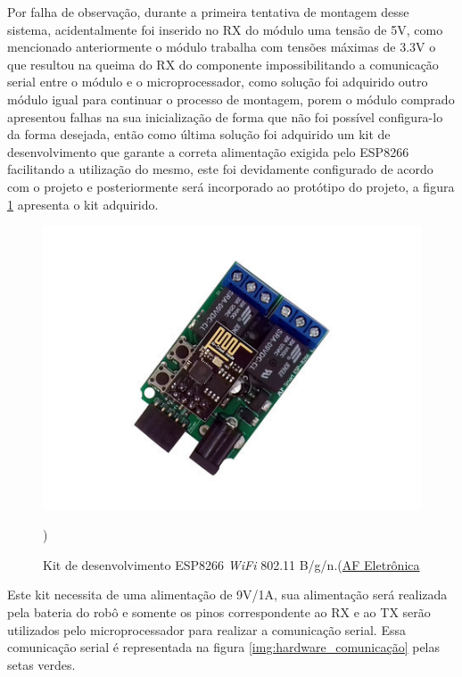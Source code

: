     	Por falha de observação, durante a primeira tentativa de montagem desse sistema, acidentalmente foi inserido no RX do módulo uma tensão de 5V, como mencionado anteriormente o módulo trabalha com tensões máximas de 3.3V o que resultou na queima do RX do componente impossibilitando a comunicação serial entre o módulo e o microprocessador, como solução foi adquirido outro módulo igual para continuar o processo de montagem, porem o módulo comprado apresentou falhas na sua inicialização de forma que não foi possível configura-lo da forma desejada, então como última solução foi adquirido um kit de desenvolvimento que garante a correta alimentação exigida pelo ESP8266 facilitando a utilização do mesmo, este foi devidamente configurado de acordo com o projeto e posteriormente será incorporado ao protótipo do projeto, a figura \ref{img:kit_desenvolvimento} apresenta o kit adquirido.

    	\begin{figure}[H]                                                           
      		\centering                    
      		\includegraphics[scale=0.5]{figuras/kit_desenvolvimento.jpg}               
      		\caption{Kit de desenvolvimento ESP8266 \textit{WiFi} 802.11 B/g/n.(\href{http://www.afeletronica.com.br/pd-31421a-esp8266-wifi-802-11-b-g-n-kit-desenvolvimento.html}{AF Eletrônica}})    
      		\label{img:kit_desenvolvimento}                                            
    	\end{figure}

    	Este kit necessita de uma alimentação de 9V/1A, sua alimentação será realizada pela bateria do robô e somente os pinos correspondente ao RX e ao TX serão utilizados pelo microprocessador para realizar a comunicação serial. Essa comunicação serial é representada na figura \ref{img:hardware_comunicação} pelas setas verdes.

